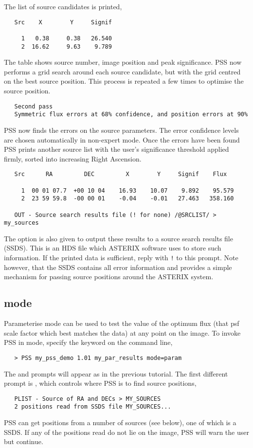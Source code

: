 The list of source candidates is printed,
\begin{verbatim}
   Src    X        Y     Signif

     1   0.38     0.38   26.540
     2  16.62     9.63    9.789
\end{verbatim}
The table shows source number, image position and peak significance. PSS 
now performs a grid search around each source candidate, but with the grid
centred on the best source position. This process is repeated a few times
to optimise the source position.
\begin{verbatim}
   Second pass
   Symmetric flux errors at 68% confidence, and position errors at 90%
\end{verbatim}
PSS now finds the errors on the source parameters. The error confidence
levels are chosen automatically in non-expert mode. Once the errors have
been found PSS prints another source list with the user's significance
threshold applied firmly, sorted into increasing Right Ascension.
\begin{verbatim}
   Src      RA         DEC         X        Y     Signif    Flux
 
     1  00 01 07.7  +00 10 04    16.93    10.07    9.892    95.579
     2  23 59 59.8  -00 00 01    -0.04    -0.01   27.463   358.160

   OUT - Source search results file (! for none) /@SRCLIST/ > my_sources
\end{verbatim}
The option is also given to output these results to a source
search results file (SSDS). This is an HDS file which ASTERIX
software uses to store such information. If the printed data
is sufficient, reply with \verb+!+ to this prompt. Note however,
that the SSDS contains all error information and provides a
simple mechanism for passing source positions around the ASTERIX
system.


\subsection{ mode}
\label{pss:tut:param}
Parameterise mode can be used to test the value of the optimum flux
(that psf scale factor which best matches the data) at any point on the image.
To invoke PSS in  mode, specify the  keyword on the
command line,
\begin{verbatim}
   > PSS my_pss_demo 1.01 my_par_results mode=param
\end{verbatim}
The  and  prompts will appear as in the 
previous tutorial. The first different prompt is , which
controls where PSS is to find source positions,
\begin{verbatim}
   PLIST - Source of RA and DECs > MY_SOURCES
   2 positions read from SSDS file MY_SOURCES...
\end{verbatim}
PSS can get positions from a number of sources (see below), one of
which is a SSDS. If any of the positions read do not lie on the
image, PSS will warn the user but continue.

